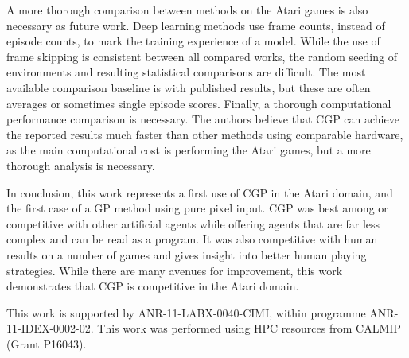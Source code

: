 \documentclass[sigconf,screen]{acmart}\settopmatter{printfolios=true,printacmref=false}
\begin{document}
A more thorough comparison between methods on the Atari games is also necessary
as future work. Deep learning methods use frame counts, instead of episode
counts, to mark the training experience of a model. While the use of frame
skipping is consistent between all compared works, the random seeding of
environments and resulting statistical comparisons are difficult. The most
available comparison baseline is with published results, but these are often
averages or sometimes single episode scores. Finally, a thorough computational
performance comparison is necessary. The authors believe that CGP can achieve
the reported results much faster than other methods using comparable hardware,
as the main computational cost is performing the Atari games, but a more
thorough analysis is necessary.

In conclusion, this work represents a first use of CGP in the Atari domain, and
the first case of a GP method using pure pixel input. CGP was best among or
competitive with other artificial agents while offering agents that are far less
complex and can be read as a program. It was also competitive with human results
on a number of games and gives insight into better human playing strategies.
While there are many avenues for improvement, this work demonstrates that CGP is
competitive in the Atari domain.
 
\begin{acks}
This work is supported by ANR-11-LABX-0040-CIMI, within programme
ANR-11-IDEX-0002-02. This work was performed using HPC resources from CALMIP
(Grant P16043).
\end{acks}


 
\end{document}
